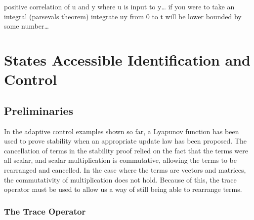positive correlation of u and y where u is input to y\ldots
if you were to take an integral (parsevals theorem) integrate uy from 0 to t will be lower bounded by some number\ldots

\chapter{States Accessible Identification and Control}

\section{Preliminaries}

In the adaptive control examples shown so far, a Lyapunov function has been used to prove stability when an appropriate update law has been proposed.
The cancellation of terms in the stability proof relied on the fact that the terms were all scalar, and scalar multiplication is commutative, allowing the terms to be rearranged and cancelled.
In the case where the terms are vectors and matrices, the commutativity of multiplication does not hold.
Because of this, the trace operator must be used to allow us a way of still being able to rearrange terms.

\subsection{The Trace Operator}

